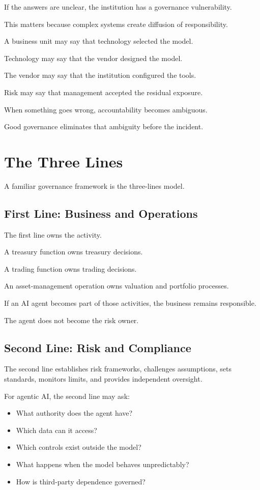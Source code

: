 If the answers are unclear, the institution has a governance vulnerability.

This matters because complex systems create diffusion of responsibility.

A business unit may say that technology selected the model.

Technology may say that the vendor designed the model.

The vendor may say that the institution configured the tools.

Risk may say that management accepted the residual exposure.

When something goes wrong, accountability becomes ambiguous.

Good governance eliminates that ambiguity before the incident.

\section{The Three Lines}

A familiar governance framework is the three-lines model.

\subsection{First Line: Business and Operations}

The first line owns the activity.

A treasury function owns treasury decisions.

A trading function owns trading decisions.

An asset-management operation owns valuation and portfolio processes.

If an AI agent becomes part of those activities, the business remains responsible.

The agent does not become the risk owner.

\subsection{Second Line: Risk and Compliance}

The second line establishes risk frameworks, challenges assumptions, sets standards, monitors limits, and provides independent oversight.

For agentic AI, the second line may ask:

\begin{itemize}
    \item What authority does the agent have?
    \item Which data can it access?
    \item Which controls exist outside the model?
    \item What happens when the model behaves unpredictably?
    \item How is third-party dependence governed?
\end{itemize}

